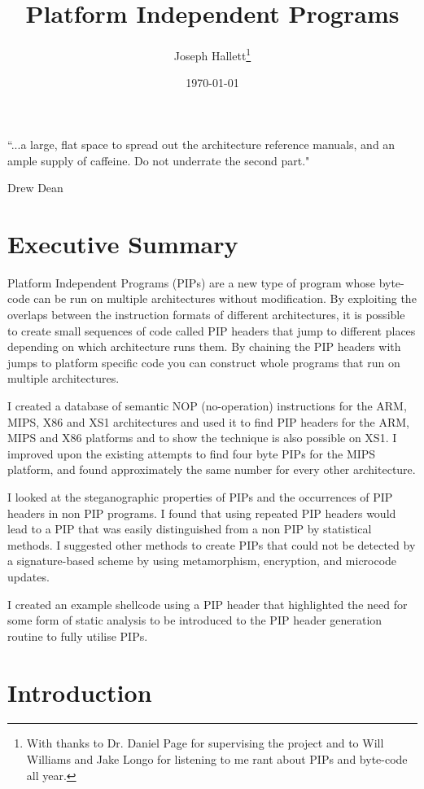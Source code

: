 \documentclass[10pt]{book}
\title{Platform Independent Programs}
\author{Joseph Hallett\thanks{With thanks to Dr. Daniel Page for supervising the project and to Will Williams and Jake Longo for listening to me rant about PIPs and byte-code all year.}}
\date{\today}
\begin{document}




\maketitle

\epigraph{\textsf{``{.}{.}{.}a large, flat space to spread out the architecture reference manuals, and an ample supply of caffeine. Do not underrate the second part."}}{\textsf{Drew Dean}}

\tableofcontents
\listoftables
\lstlistoflistings
\chapter{Executive Summary}

Platform Independent Programs (PIPs) are a new type of program whose byte-code can be run on multiple architectures without modification. By exploiting the overlaps between the instruction formats of different architectures, it is possible to create small sequences of code called PIP headers that jump to different places depending on which architecture runs them. By chaining the PIP headers with jumps to platform specific code you can construct whole programs that run on multiple architectures.

I created a database of semantic NOP (no-operation) instructions for the ARM, MIPS, X86 and XS1 architectures and used it to find PIP headers for the ARM, MIPS and X86 platforms and to show the technique is also possible on XS1. 
I improved upon the existing attempts to find four byte PIPs for the MIPS platform, and found approximately the same number for every other architecture. 

I looked at the steganographic properties of PIPs and the occurrences of PIP headers in non PIP programs.  I found that using repeated PIP headers would lead to a PIP that was easily distinguished from a non PIP by statistical methods. I suggested other methods to create PIPs that could not be detected by a signature-based scheme by using metamorphism, encryption, and microcode updates.

I created an example shellcode using a PIP header that highlighted the need for some form of static analysis to be introduced to the PIP header generation routine to fully utilise PIPs.

\chapter{Introduction}
\end{document}
